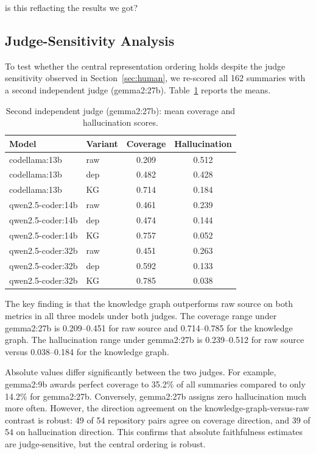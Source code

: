 is this reflacting the results we got?\documentclass[conference]{IEEEtran}
\begin{document}
\subsection{Judge-Sensitivity Analysis}
\label{sec:results-judges}
To test whether the central representation ordering holds despite the judge sensitivity observed in Section~\ref{sec:human}, we re-scored all 162 summaries with a second independent judge (gemma2:27b). Table~\ref{tab:secondjudge} reports the means.

\begin{table}[htbp]
\caption{Second independent judge (gemma2:27b): mean coverage and hallucination scores.}
\label{tab:secondjudge}
\centering
\begin{tabular}{@{}llcc@{}}
\toprule
Model & Variant & Coverage & Hallucination \\
\midrule
codellama:13b & raw & 0.209 & 0.512 \\
codellama:13b & dep & 0.482 & 0.428 \\
codellama:13b & KG & 0.714 & 0.184 \\
\midrule
qwen2.5-coder:14b & raw & 0.461 & 0.239 \\
qwen2.5-coder:14b & dep & 0.474 & 0.144 \\
qwen2.5-coder:14b & KG & 0.757 & 0.052 \\
\midrule
qwen2.5-coder:32b & raw & 0.451 & 0.263 \\
qwen2.5-coder:32b & dep & 0.592 & 0.133 \\
qwen2.5-coder:32b & KG & 0.785 & 0.038 \\
\bottomrule
\end{tabular}
\end{table}

The key finding is that the knowledge graph outperforms raw source on both metrics in all three models under both judges. The coverage range under gemma2:27b is 0.209--0.451 for raw source and 0.714--0.785 for the knowledge graph. The hallucination range under gemma2:27b is 0.239--0.512 for raw source versus 0.038--0.184 for the knowledge graph.

Absolute values differ significantly between the two judges. For example, gemma2:9b awards perfect coverage to 35.2\% of all summaries compared to only 14.2\% for gemma2:27b. Conversely, gemma2:27b assigns zero hallucination much more often. However, the direction agreement on the knowledge-graph-versus-raw contrast is robust: 49 of 54 repository pairs agree on coverage direction, and 39 of 54 on hallucination direction. This confirms that absolute faithfulness estimates are judge-sensitive, but the central ordering is robust.
\end{document}
